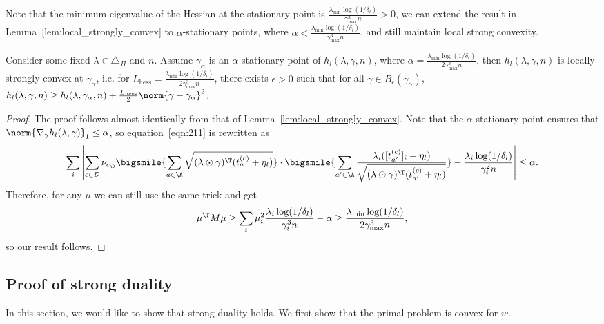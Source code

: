 \documentclass{article}
\newcommand{\mc}[1]{\mathcal{#1}}
\newcommand{\1}{\mathbf{1}}
\newcommand{\He}{\operatorname{hess}}
\begin{document}
Note that the minimum eigenvalue of the Hessian at the stationary point is $\frac{\lambda_{\min}\log(1/\delta_l)}{\gamma_{\max}^3 n}>0$, we can extend the result in Lemma~\ref{lem:local_strongly_convex} to $\alpha$-stationary points, where $\alpha<\frac{\lambda_{\min}\log(1/\delta_l)}{\gamma_{\max}^3 n}$, and still maintain local strong convexity. 
\begin{lemma}\label{lem:local_strong_convex_eps}
Consider some fixed $\lambda\in\triangle_\Pi$ and $n$. Assume $\gamma_\alpha$ is an $\alpha$-stationary point of $h_l(\lambda,\gamma,n)$, where $\alpha=\frac{\lambda_{\min}\log(1/\delta_l)}{2\gamma_{\max}^3 n}$, then $h_l(\lambda,\gamma,n)$ is locally strongly convex at $\gamma_\alpha$, i.e. for $L_{\He}=\frac{\lambda_{\min}\log(1/\delta_l)}{2\gamma_{\max}^3 n}$, there exists $\epsilon>0$ such that for all $\gamma\in B_\epsilon(\gamma_\alpha)$, $h_l(\lambda,\gamma,n)\geq h_l(\lambda,\gamma_\alpha,n)+\frac{L_{\He}}{2}\norm{\gamma-\gamma_\alpha}^2$. 
\end{lemma}
\begin{proof}
The proof follows almost identically from that of Lemma~\ref{lem:local_strongly_convex}. Note that the $\alpha$-stationary point ensures that $\norm{\nabla_{\gamma} h_l(\lambda,\gamma)}_1 \leq \alpha$, so equation~\ref{eqn:211} is rewritten as
\begin{equation}\label{eqn:212}
    \sum_i\left|\sum_{c\in \mc{D}}\nu_{c_\D}\bigsmile{\sum_{a\in\A}\sqrt{(\lambda\odot\gamma)^\T (t_a^{(c)}+\eta_l)}}\cdot\bigsmile{\sum_{a'\in\A}\frac{\lambda_i([t_{a'}^{(c)}]_i+\eta_l)}{\sqrt{(\lambda\odot\gamma)^\T (t_{a'}^{(c)}+\eta_l)}}}-\frac{\lambda_i\log(1/\delta_l)}{\gamma_i^2 n}\right|\leq \alpha.
\end{equation}
Therefore, for any $\mu$ we can still use the same trick and get 
\[\mu^\T M\mu\geq\sum_{i}\mu_i^2\frac{\lambda_i\log(1/\delta_l)}{\gamma_i^3 n}-\alpha\geq \frac{\lambda_{\min}\log(1/\delta_l)}{2\gamma_{\max}^3 n},\]
so our result follows. 
\end{proof}

\subsection{Proof of strong duality}

In this section, we would like to show that strong duality holds. We first show that the primal problem is convex for $w$. 
\end{document}
